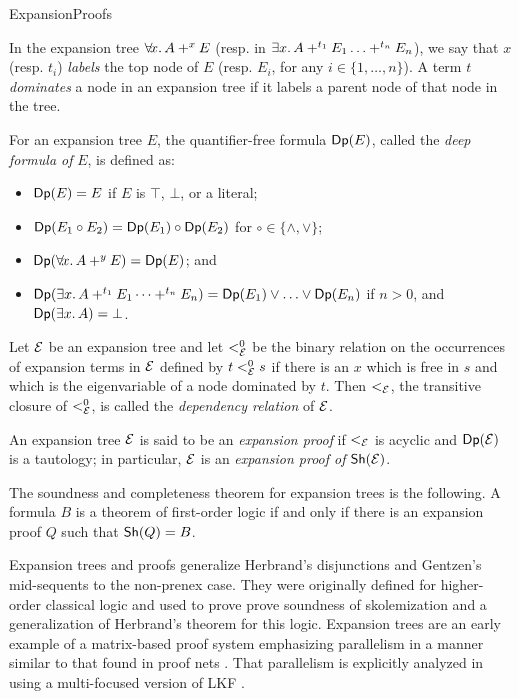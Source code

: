 \begin{entry}{ExpansionProofs}
\begin{calculus}
\medskip

In the expansion tree $\ALLx x. A +^x E$ (resp. in $\EX x. A +^{t_1} E_1
\ldots +^{t_n} E_n$), we say that $x$ (resp. $t_i$) \emph{labels} the top node
of $E$ (resp. $E_i$, for any $i \in\{1,\ldots,n\}$).  A term
$t$ \emph{dominates} a node in an expansion tree if it labels a parent
node of that node in the tree.

\medskip

For an expansion tree $E$, the quantifier-free formula $\mathsf{Dp}(E)$, 
called the \emph{deep formula of} $E$, is defined as:
\begin{itemize}
\item $\mathsf{Dp}(E) = E$ if $E$ is $\top$, $\bot$, or a literal;
\item $\mathsf{Dp}(E_1 \circ E_2) = \mathsf{Dp}(E_1) \circ \mathsf{Dp}(E_2)$ for
      $\circ\in\{\land, \lor \}$; 
\item $\Deep{\ALLx x. A +^y E} = \Deep{E}$; and
\item $\Deep{\EX x. A +^{t_1} E_1 \cdots +^{t_n} E_n} = 
       \Deep{E_1}\lor\ldots\lor \Deep{E_n}$ if $n > 0$, and $\Deep{\EX
  x. A} = \bot$. 
\end{itemize}

Let $\mathcal{E}$ be an expansion tree and let $<^0_{\mathcal{E}}$ be the binary
relation on the occurrences of expansion terms in $\mathcal{E}$ defined by
$t <^0_{\mathcal{E}} s$ if there is an $x$ which is free in $s$ and which is
the eigenvariable of a node dominated by $t$.  Then $<_{\mathcal{E}}$, the
transitive closure of $<^0_{\mathcal{E}}$, is called the
\emph{dependency relation} of $\mathcal{E}$.

\medskip

An expansion tree $\mathcal{E}$ is said to be an \emph{expansion proof} if
$<_{\mathcal{E}}$ is acyclic and $\mathsf{Dp}(\mathcal{E})$ is a tautology; in particular,
$\mathcal{E}$ is an \emph{expansion proof of} $\mathsf{Sh}(\mathcal{E})$.
\end{calculus}


\begin{clarifications}
The soundness and completeness theorem for expansion trees is the
following.  A formula $B$ is a theorem of first-order logic if and
only if there is an expansion proof $Q$ such that $\mathsf{Sh}(Q)=B$.
\end{clarifications}

\begin{history}
Expansion trees and proofs \cite{miller87sl,miller83}
generalize Herbrand's disjunctions and
Gentzen's mid-sequents to the non-prenex case.  
They were originally defined
for higher-order classical logic and used to prove prove soundness
of skolemization and a generalization of
Herbrand's theorem for this logic.  Expansion trees are an early example of a
matrix-based proof system emphasizing parallelism in a manner similar to that found in proof
nets .  That parallelism is explicitly analyzed
in \cite{chaudhuri14jlc} using a multi-focused version of
LKF .
\end{history}



\end{entry}
